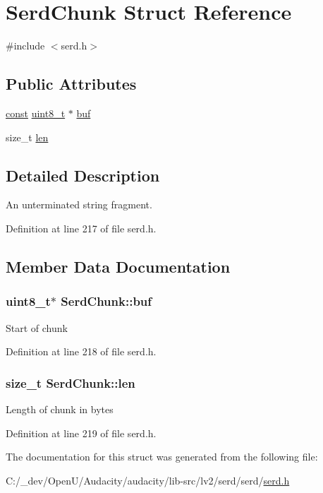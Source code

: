 \hypertarget{struct_serd_chunk}{}\section{Serd\+Chunk Struct Reference}
\label{struct_serd_chunk}


{\ttfamily \#include $<$serd.\+h$>$}

\subsection*{Public Attributes}
\begin{DoxyCompactItemize}
\item 
\hyperlink{getopt1_8c_a2c212835823e3c54a8ab6d95c652660e}{const} \hyperlink{lib-src_2ffmpeg_2win32_2stdint_8h_a9a941819355e6f658991890ff66b4b0e}{uint8\+\_\+t} $\ast$ \hyperlink{struct_serd_chunk_a1fb21c23d2c2eecac5cf57b10ac370f6}{buf}
\item 
size\+\_\+t \hyperlink{struct_serd_chunk_a0a9e8bfa17dc87785f51262ba4769278}{len}
\end{DoxyCompactItemize}


\subsection{Detailed Description}
An unterminated string fragment. 

Definition at line 217 of file serd.\+h.



\subsection{Member Data Documentation}
\subsubsection[{\texorpdfstring{buf}{buf}}]{ {\bf uint8\+\_\+t}$\ast$ Serd\+Chunk\+::buf}\hypertarget{struct_serd_chunk_a1fb21c23d2c2eecac5cf57b10ac370f6}{}\label{struct_serd_chunk_a1fb21c23d2c2eecac5cf57b10ac370f6}
Start of chunk 

Definition at line 218 of file serd.\+h.

\subsubsection[{\texorpdfstring{len}{len}}]{\setlength{\rightskip}{0pt plus 5cm}size\+\_\+t Serd\+Chunk\+::len}\hypertarget{struct_serd_chunk_a0a9e8bfa17dc87785f51262ba4769278}{}\label{struct_serd_chunk_a0a9e8bfa17dc87785f51262ba4769278}
Length of chunk in bytes 

Definition at line 219 of file serd.\+h.



The documentation for this struct was generated from the following file\+:\begin{DoxyCompactItemize}
\item 
C\+:/\+\_\+dev/\+Open\+U/\+Audacity/audacity/lib-\/src/lv2/serd/serd/\hyperlink{serd_8h}{serd.\+h}\end{DoxyCompactItemize}
